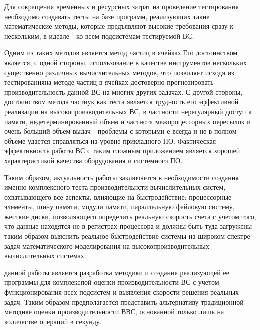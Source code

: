  Для сокращения временных и ресурсных затрат на проведение тестирования необходимо создавать тесты на базе программ, реализующих такие математические методы, которые предъявляют высокие требования сразу к нескольким, в идеале - ко всем подсистемам тестируемой ВС. 
 
 Одним из таких методов является метод частиц в ячейках.Его достоинством является, с одной стороны, использование в качестве инструментов нескольких существенно различных вычислительных методов, что позволяет исходя из тестированияна методе частиц в ячейках достоверно прогнозировать производительность данной ВС на многих других задачах. С другой стороны, достоинством метода частиук как теста является трудность его эффективной реализации на высокопроизводительных ВС, в частности нерегулярный доступ к памяти, недетерминированный объем и частнота межпроцессорных пересылок и очень больший объем выдач - проблемы с которыми е всегда и не в полном объеме удается справляться на уровне прикладного ПО. Фактическая эффективность работы ВС с таким сложным приложением является хорошей характеристикой качества оборудования и системного ПО.
 
 Таким образом, актуальность работы заключается в необходимости создания именно комплексного теста производительнсти вычислительных систем, охватывающего все аспекты, влияющие на быстродействие: процессорные элементы, шину памяти, модули памяти, параллельную файловую систему, жесткие диски, позволяющего определить  реальную скорость счета с учетом того, что данные находятся не в регистрах процессора и должны быть туда загружены таким образом выяснить реальное быстродействие системы на широком спектре задач математического моделирования на высокопроизводительных вычислительных системах. 


{\aim} данной работы является разработка методики и создание реализующей ее программы для комплекспой оценки производительности ВС с учетом функционирования всех подсистем  и выявления скорости решения реальных задач. Таким образом предполагается представить альтернативу традиционной методике оценки производительности ВВС, основанной только лишь на количестве операций в секунду.  

